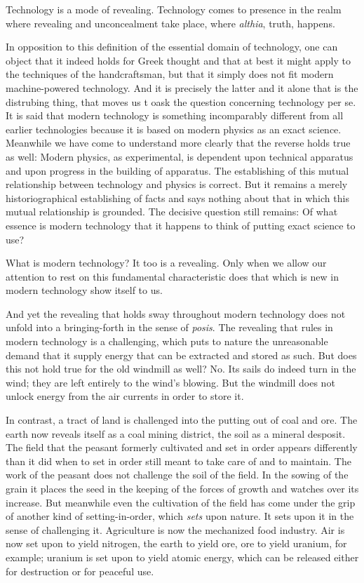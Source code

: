 Technology is a mode of revealing. Technology comes to presence in the realm where revealing and unconcealment take place, where \textit{althia}, truth, happens.

In opposition to this definition of the essential domain of technology, one can object that it indeed holds for Greek thought and that at best it might apply to the techniques of the handcraftsman, but that it simply does not fit modern machine-powered technology. And it is precisely the latter and it alone that is the distrubing thing, that moves us t oask the question concerning technology per se. It is said that modern technology is something incomparably different from all earlier technologies because it is based on modern physics as an exact science. Meanwhile we have come to understand more clearly that the reverse holds true as well: Modern physics, as experimental, is dependent upon technical apparatus and upon progress in the building of apparatus. The establishing of this mutual relationship between technology and physics is correct. But it remains a merely historiographical establishing of facts and says nothing about that in which this mutual relationship is grounded. The decisive question still remains: Of what essence is modern technology that it happens to think of putting exact science to use?

What is modern technology? It too is a revealing. Only when we allow our attention to rest on this fundamental characteristic does that which is new in modern technology show itself to us. 

And yet the revealing that holds sway throughout modern technology does not unfold into a bringing-forth in the sense of \textit{posis}. The revealing that rules in modern technology is a challenging, which puts to nature the unreasonable demand that it supply energy that can be extracted and stored as such. But does this not hold true for the old windmill as well? No. Its sails do indeed turn in the wind; they are left entirely to the wind's blowing. But the windmill does not unlock energy from the air currents in order to store it.

In contrast, a tract of land is challenged into the putting out of coal and ore. The earth now reveals itself as a coal mining district, the soil as a mineral desposit. The field that the peasant formerly cultivated and set in order appears differently than it did when to set in order still meant to take care of and to maintain. The work of the peasant does not challenge the soil of the field. In the sowing of the grain it places the seed in the keeping of the forces of growth and watches over its increase. But meanwhile even the cultivation of the field has come under the grip of another kind of setting-in-order, which \textit{sets} upon nature. It sets upon it in the sense of challenging it. Agriculture is now the mechanized food industry. Air is now set upon to yield nitrogen, the earth to yield ore, ore to yield uranium, for example; uranium is set upon to yield atomic energy, which can be released either for destruction or for peaceful use.

